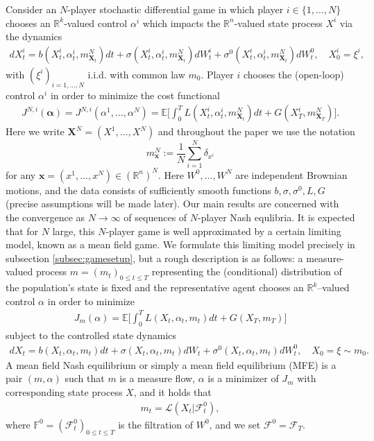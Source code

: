 \documentclass[11pt,reqno]{amsart}
\numberwithin{equation}{section}
\theoremstyle{definition}
\def\E{{\mathbb E}}
\def\R{{\mathbb R}}
\newcommand{\bx}{\mathbf{x}}
\newcommand{\bX}{\mathbf{X}}
\newcommand{\sL}{\mathcal{L}}
\newcommand{\sF}{\mathcal{F}}
\newcommand{\bbF}{\mathbb{F}}
\def \E{\mathbb{E}}
\def \R{\mathbb{R}}
\begin{document}
Consider an $N$-player stochastic differential game in which player $i \in\{ 1,\dots,N\}$ chooses an $\R^k$-valued control $\alpha^i$ which impacts the $\R^n$-valued state process $X^i$ via the dynamics 
\begin{align*}
dX_t^i = b(X_t^i, \alpha_t^i, m_{\bX_t}^N) dt + \sigma(X_t^i, \alpha_t^i, m_{\bX_t}^N) dW_t^i + \sigma^0(X_t^i, \alpha_t^i, m_{\bX_t}^N) dW_t^0, \quad X_0^i = \xi^i, 
\end{align*}
with $(\xi^i)_{i = 1,\dots,N}$ i.i.d. with common law $m_0$. 
Player $i$ chooses the (open-loop) control $\alpha^i$ in order to minimize the cost functional 
\begin{align*}
J^{N,i}(\bm \alpha) = J^{N,i}(\alpha^1,\dots,\alpha^N) = \E\bigg[ \int_0^T L(X_t^i,\alpha_t^i,m_{\bX_t}^N) dt + G(X_T^i,m_{\bX_T}^N) \bigg].
\end{align*}
Here we write $\bX^N = (X^1,\dots,X^N)$ and throughout the paper we use the notation
$$m^N_{\bx}:= \frac1N\sum_{i=1}^N\delta_{x^i}$$ for any $\bx = (x^1,\dots, x^N) \in (\R^n)^N$.
Here $W^0,\dots,W^N$ are independent Brownian motions, and the data consists of sufficiently smooth functions $b, \sigma, \sigma^0, L,  G$ (precise assumptions will be made later). Our main results are concerned with the convergence as $N \to \infty$ of sequences of $N$-player Nash equlibria.
It is expected that for $N$ large, this $N$-player game is well approximated by a certain limiting model, known as a mean field game.
We formulate this limiting model precisely in subsection \ref{subsec:gamesetup}, but a rough description is as follows: a measure-valued process $m = (m_t)_{0 \leq t \leq T}$ representing the (conditional) distribution of the population's state is fixed and the representative agent chooses an $\R^k$--valued control $\alpha$
in order to minimize
\begin{align}
  J_m(\alpha) = \E\bigg[  \int_0^T  L(X_t, \alpha_t, m_t) dt + G(X_T,m_T) \bigg]
\end{align}
subject to the controlled state dynamics
\begin{align}  \label{mfdynamicsintro}
dX_t =  b(X_t, \alpha_t, m_t) dt +\sigma(X_t,\alpha_t, m_t)d W_t + \sigma^0(X_t, \alpha_t, m_t)d W_t^0, \quad X_0 = \xi \sim m_0. 
\end{align}
A mean field Nash equilibrium or simply a mean field equilibrium (MFE) is a pair $(m, \alpha)$ such that $m$ is a measure flow, $\alpha$ is a minimizer of $J_{m}$ with corresponding state process $X$, and it holds that
\begin{align*}
 m_t = \sL(X_t | \sF_t^0), 
\end{align*}
where $\bbF^0 = (\sF_t^0)_{0 \leq t \leq T}$ is the filtration of $W^0$, and we set $\sF^0 = \sF_T$.
\end{document}
